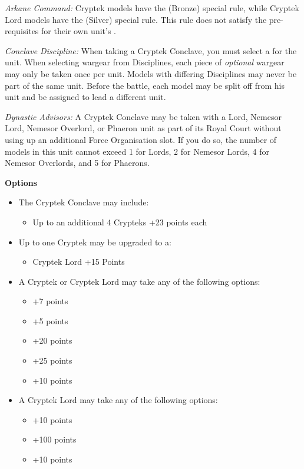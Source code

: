 \begin{minipage}[t]{0.72\textwidth}
	\textit{Arkane Command:} Cryptek models have the  (Bronze) special rule, while Cryptek Lord models have the  (Silver) special rule. This rule does not satisfy the pre-requisites for their own unit's .
	
	\textit{Conclave Discipline:} When taking a Cryptek Conclave, you must select a  for the unit. When selecting wargear from Disciplines, each piece of \textit{optional} wargear may only be taken once per unit. Models with differing Disciplines may never be part of the same unit. Before the battle, each model may be split off from his unit and be assigned to lead a different unit.
	
	\textit{Dynastic Advisors:} A Cryptek Conclave may be taken with a Lord, Nemesor Lord, Nemesor Overlord, or Phaeron unit as part of its Royal Court without using up an additional Force Organisation slot. If you do so, the number of models in this unit cannot exceed 1 for Lords, 2 for Nemesor Lords, 4 for Nemesor Overlords, and 5 for Phaerons.
	
	\vspace*{2em}
	\textbf{Options}
	\begin{itemize}
		\item The Cryptek Conclave may include:
		\begin{itemize}
			\item Up to an additional 4 Crypteks \dotfill +23 points each
		\end{itemize}
		\item Up to one Cryptek may be upgraded to a:
		\begin{itemize}
			\item Cryptek Lord \dotfill +15 Points
		\end{itemize}
		\item A Cryptek or Cryptek Lord may take any of the following options:
		\begin{itemize}
			\item {} \dotfill +7 points
			\item {} \dotfill +5 points
			\item {} \dotfill +20 points
			\item {} \dotfill +25 points
			\item {} \dotfill +10 points
		\end{itemize}
		\item A Cryptek Lord may take any of the following options:
		\begin{itemize}
			\item {} \dotfill +10 points
			\item {} \dotfill +100 points
			\item {} \dotfill +10 points
		\end{itemize}
	\end{itemize}


\end{minipage}
